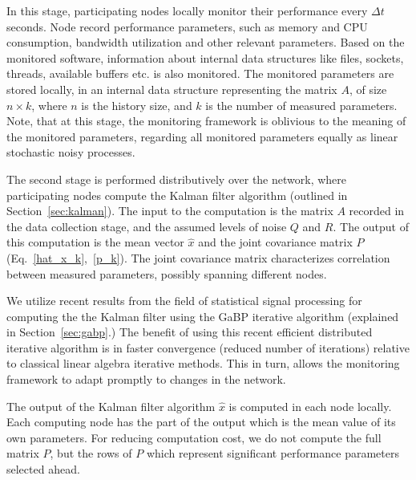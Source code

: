 \documentclass[times, 10pt,twocolumn]{article}
\begin{document}
In this stage, participating nodes locally monitor their performance every $\Delta t$ seconds. Node record performance parameters, such as memory and CPU consumption, bandwidth utilization and other relevant parameters. Based on the monitored software, information about internal data structures
like files, sockets, threads, available buffers etc. is also monitored. The monitored parameters
are stored locally, in an internal data structure representing the matrix $A$, of size $n \times k$, where $n$ is the history
size, and $k$ is the number of measured parameters. Note, that at this stage, the monitoring framework is oblivious to the meaning of the monitored parameters, regarding all monitored parameters equally as linear stochastic noisy processes.

The second stage is performed distributively over the network, where participating nodes compute the Kalman filter
algorithm (outlined in Section~\ref{sec:kalman}). The input to the computation is the matrix $A$ recorded in the data collection stage, and the assumed levels of noise $Q$ and $R$. The output of this computation is the mean vector $\hat{x}$ and the joint covariance matrix $P$ (Eq.~\ref{hat_x_k},~\ref{p_k}). The joint covariance matrix characterizes correlation between measured parameters, possibly spanning different nodes.

We utilize recent results from the field of statistical signal processing for computing the the Kalman filter
using the GaBP iterative algorithm (explained in Section~\ref{sec:gabp}.) The benefit of using this recent efficient distributed iterative algorithm is in faster convergence (reduced number of iterations) relative to classical
linear algebra iterative methods. This in turn, allows the monitoring framework to adapt promptly to changes in the network.

The output of the Kalman filter algorithm  $\hat{x}$ is computed in each node locally. Each computing node has the part of the output which is the mean
value of its own parameters. For reducing computation cost, we do not compute the full matrix $P$, but the rows of $P$ which represent significant performance parameters selected ahead. 
\end{document}
